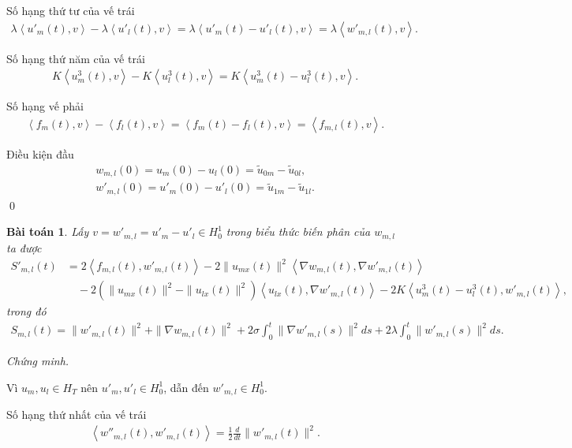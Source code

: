 \documentclass[12pt,a4paper]{article}
\newtheorem{theorem}{Bài toán}[section]
\theoremstyle{definition}
\begin{document}
Số hạng thứ tư của vế trái
\begin{align*}
    \lambda \left<u'_m(t),v\right> - \lambda \left<u'_l(t),v\right>
    = \lambda \left<u'_m(t) - u'_l(t),v\right>
    = \lambda \left<w'_{m,l}(t),v\right>.
\end{align*}

Số hạng thứ năm của vế trái
\begin{align*}
    K \left<u^3_m(t),v\right> - K \left<u^3_l(t),v\right>
    = K \left<u^3_m(t) - u^3_l(t),v\right>.
\end{align*}

Số hạng vế phải
\begin{align*}
    \left<f_m(t),v\right> - \left<f_l(t),v\right>
    = \left<f_m(t) - f_l(t),v\right>
    = \left<f_{m,l}(t),v\right>.
\end{align*}

Điều kiện đầu
\begin{align*}
    w_{m,l}(0) = u_m(0) - u_l(0) = \tilde{u}_{0m} - \tilde{u}_{0l}, \\
    w'_{m,l}(0) = u'_m(0) - u'_l(0) = \tilde{u}_{1m} - \tilde{u}_{1l}.
\end{align*} \qed

\begin{theorem}
    Lấy $v = w'_{m,l} = u'_m - u'_l \in H^1_0$ trong biểu thức biến phân của $w_{m,l}$ ta được
    \begin{align*}
        S'_{m,l}(t) &= 2 \left<f_{m,l}(t),w'_{m,l}(t)\right>
        - 2 \|u_{mx}(t)\|^2 \left<\nabla w_{m,l}(t), \nabla w'_{m,l}(t)\right> \\
        &\quad- 2 \left(\|u_{mx}(t)\|^2 - \|u_{lx}(t)\|^2\right) \left<u_{lx}(t), \nabla w'_{m,l}(t)\right>
        - 2 K \left<u^3_m(t) - u^3_l(t), w'_{m,l}(t)\right>,
    \end{align*}
    trong đó
    \begin{align*}
        S_{m,l}(t) = \|w'_{m,l}(t)\|^2 + \|\nabla w_{m,l}(t)\|^2
        + 2 \sigma \int_0^t \|\nabla w'_{m,l}(s)\|^2 ds
        + 2 \lambda \int_0^t \|w'_{m,l}(s)\|^2 ds.
    \end{align*}
\end{theorem}

\textit{Chứng minh.}

Vì $u_m, u_l \in H_T$ nên $u'_m, u'_l \in H^1_0$, dẫn đến $w'_{m,l} \in H^1_0$. 

Số hạng thứ nhất của vế trái
\begin{align*}
    \left<w''_{m,l}(t), w'_{m,l}(t)\right> = \frac{1}{2} \frac{d}{dt} \|w'_{m,l}(t)\|^2.
\end{align*}
\end{document}
